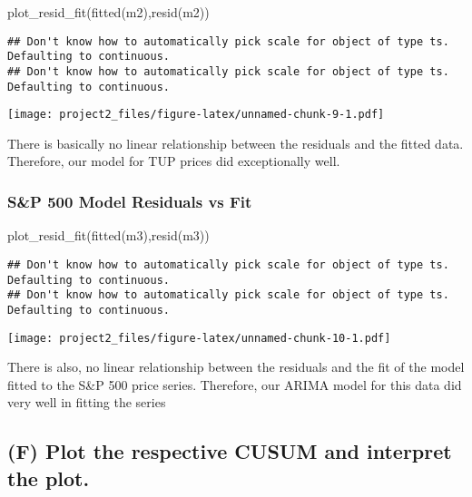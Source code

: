 \documentclass[
  10.5pt,
]{article}
\newenvironment{Shaded}{\begin{snugshade}}{\end{snugshade}}
\newcommand{\FunctionTok}[1]{\textcolor[rgb]{0.00,0.00,0.00}{#1}}
\newcommand{\NormalTok}[1]{#1}
\begin{document}
\begin{Shaded}
\begin{Highlighting}[]
\FunctionTok{plot\_resid\_fit}\NormalTok{(}\FunctionTok{fitted}\NormalTok{(m2),}\FunctionTok{resid}\NormalTok{(m2))}
\end{Highlighting}
\end{Shaded}

\begin{verbatim}
## Don't know how to automatically pick scale for object of type ts. Defaulting to continuous.
## Don't know how to automatically pick scale for object of type ts. Defaulting to continuous.
\end{verbatim}

\texttt{[image: project2\_files/figure-latex/unnamed-chunk-9-1.pdf]}

There is basically no linear relationship between the residuals and the
fitted data. Therefore, our model for TUP prices did exceptionally well.

\hypertarget{sp-500-model-residuals-vs-fit}{%
\subsubsection{S\&P 500 Model Residuals vs
Fit}\label{sp-500-model-residuals-vs-fit}}

\begin{Shaded}
\begin{Highlighting}[]
\FunctionTok{plot\_resid\_fit}\NormalTok{(}\FunctionTok{fitted}\NormalTok{(m3),}\FunctionTok{resid}\NormalTok{(m3))}
\end{Highlighting}
\end{Shaded}

\begin{verbatim}
## Don't know how to automatically pick scale for object of type ts. Defaulting to continuous.
## Don't know how to automatically pick scale for object of type ts. Defaulting to continuous.
\end{verbatim}

\texttt{[image: project2\_files/figure-latex/unnamed-chunk-10-1.pdf]}

There is also, no linear relationship between the residuals and the fit
of the model fitted to the S\&P 500 price series. Therefore, our ARIMA
model for this data did very well in fitting the series

\hypertarget{f-plot-the-respective-cusum-and-interpret-the-plot.}{%
\subsection{(F) Plot the respective CUSUM and interpret the
plot.}\label{f-plot-the-respective-cusum-and-interpret-the-plot.}}
\end{document}
